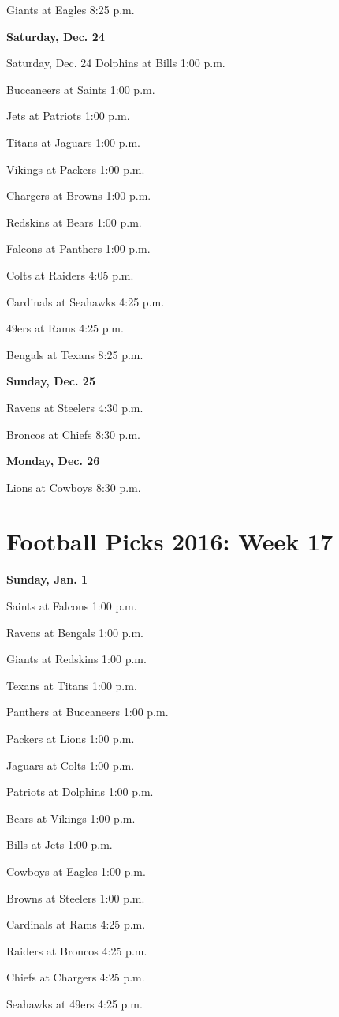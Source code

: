 \documentclass[12pt, letterpaper]{article}
\begin{document}
Giants at Eagles 8:25 p.m.\par
\noindent \Large \textbf{Saturday, Dec. 24} \par
Saturday, Dec. 24
Dolphins at Bills 1:00 p.m.\par
Buccaneers at Saints 1:00 p.m.\par
Jets at Patriots 1:00 p.m.\par
Titans at Jaguars 1:00 p.m.\par
Vikings at Packers 1:00 p.m.\par
Chargers at Browns 1:00 p.m.\par
Redskins at Bears 1:00 p.m.\par
Falcons at Panthers 1:00 p.m.\par
Colts at Raiders 4:05 p.m.\par
Cardinals at Seahawks 4:25 p.m.\par
49ers at Rams 4:25 p.m.\par
Bengals at Texans 8:25 p.m.\par
\noindent \Large \textbf{Sunday, Dec. 25} \par
Ravens at Steelers 4:30 p.m.\par
Broncos at Chiefs 8:30 p.m.\par
\noindent \Large \textbf{Monday, Dec. 26} \par
Lions at Cowboys 8:30 p.m.\par
\newpage \section*{\Huge Football Picks 2016: Week 17}
\noindent \Large \textbf{Sunday, Jan. 1} \par
Saints at Falcons 1:00 p.m.\par
Ravens at Bengals 1:00 p.m.\par
Giants at Redskins 1:00 p.m.\par
Texans at Titans 1:00 p.m.\par
Panthers at Buccaneers 1:00 p.m.\par
Packers at Lions 1:00 p.m.\par
Jaguars at Colts 1:00 p.m.\par
Patriots at Dolphins 1:00 p.m.\par
Bears at Vikings 1:00 p.m.\par
Bills at Jets 1:00 p.m.\par
Cowboys at Eagles 1:00 p.m.\par
Browns at Steelers 1:00 p.m.\par
Cardinals at Rams 4:25 p.m.\par
Raiders at Broncos 4:25 p.m.\par
Chiefs at Chargers 4:25 p.m.\par
Seahawks at 49ers 4:25 p.m.\par
\end{document}
